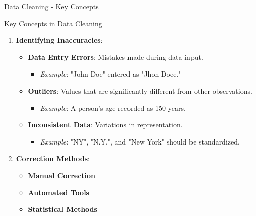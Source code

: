 \documentclass[aspectratio=169]{beamer}
\begin{document}
\begin{frame}[fragile]{Data Cleaning - Key Concepts}
    \begin{block}{Key Concepts in Data Cleaning}
        \begin{enumerate}
            \item \textbf{Identifying Inaccuracies}:
            \begin{itemize}
                \item \textbf{Data Entry Errors}: Mistakes made during data input.
                \begin{itemize}
                    \item \textit{Example}: "John Doe" entered as "Jhon Doee."
                \end{itemize}
                \item \textbf{Outliers}: Values that are significantly different from other observations.
                \begin{itemize}
                    \item \textit{Example}: A person’s age recorded as 150 years.
                \end{itemize}
                \item \textbf{Inconsistent Data}: Variations in representation.
                \begin{itemize}
                    \item \textit{Example}: "NY", "N.Y.", and "New York" should be standardized.
                \end{itemize}
            \end{itemize}
            
            \item \textbf{Correction Methods}:
            \begin{itemize}
                \item \textbf{Manual Correction}
                \item \textbf{Automated Tools}
                \item \textbf{Statistical Methods}
            \end{itemize}
        \end{enumerate}
    \end{block}
\end{frame}
\end{document}
